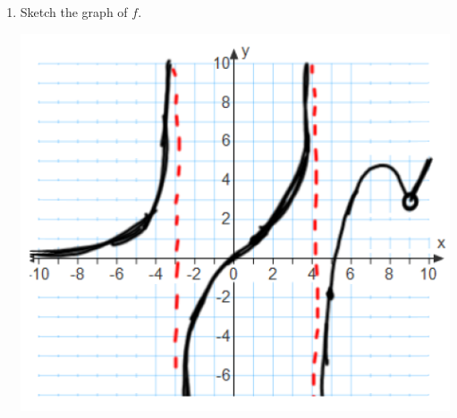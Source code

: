 \documentclass[nooutcomes]{ximera}
\begin{document}
\begin{problem}
\begin{freeResponse}
\begin{enumerate}
			
      \item
        Sketch the graph of $f$.
        \begin{image}
          \includegraphics[scale=.55]{Figure5.png}
	\end{image}
    \end{enumerate}
  \end{freeResponse}
\end{problem}
\end{document}
